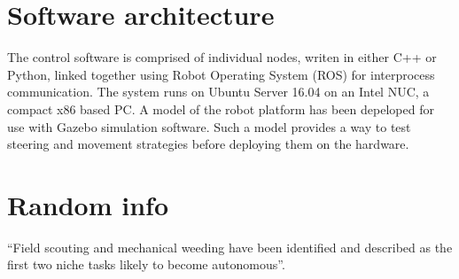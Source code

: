 \documentclass[preprint,authoryear,12pt]{elsarticle}
\begin{document}
\section{Software architecture}
\label{sect:software}
The control software is comprised of individual nodes, writen in either C++ or Python, linked together using Robot Operating System (ROS) for interprocess communication.
The system runs on Ubuntu Server 16.04 on an Intel NUC, a compact x86 based PC.
A model of the robot platform has been depeloped for use with Gazebo simulation software.
Such a model provides a way to test steering and movement strategies before deploying them on the hardware.

\section{Random info}

``Field scouting and mechanical weeding have been identified and described as the first two niche tasks likely to become autonomous''\citep{Blackmore2004}.






\end{document}
